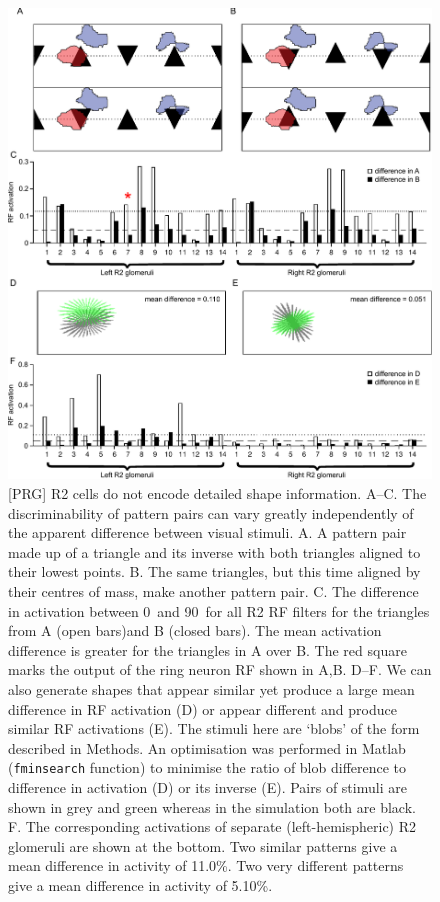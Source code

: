 \begin{figure}
\vspace{-3cm}
\centering
\includegraphics{figures/simdiffpatts}
\caption{
[PRG]
R2 cells do not encode detailed shape information.
A--C. The discriminability of pattern pairs can vary greatly independently of the apparent difference between visual stimuli. A. A pattern pair made up of a triangle and its inverse with both triangles aligned to their lowest points. B. The same triangles, but this time aligned by their centres of mass, make another pattern pair. C. The difference in activation between 0\degree\ and 90\degree\ for all R2 RF filters for the triangles from A (open bars)and B (closed bars). The mean activation difference is greater for the triangles in A over B. The red square marks the output of the ring neuron RF shown in A,B. 
D--F. We can also generate shapes that appear similar yet produce a large mean difference in RF activation (D) or appear different and produce similar RF activations (E). The stimuli here are `blobs' of the form described in Methods. An optimisation was performed in Matlab (\texttt{fminsearch} function) to minimise the ratio of blob difference to difference in activation (D) or its inverse (E). Pairs of stimuli are shown in grey and green whereas in the simulation both are black.
F. The corresponding activations of separate (left-hemispheric) R2 glomeruli are shown at the bottom. Two similar patterns give a mean difference in activity of 11.0\%. Two very different patterns give a mean difference in activity of 5.10\%.
}

\label{fig:simdiffpatts}
\end{figure}